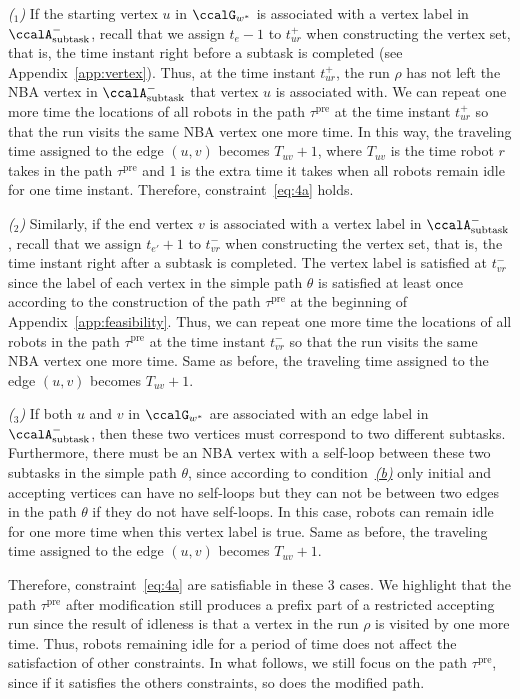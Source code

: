 \documentclass[Afour,sageh,times]{sagej}
\newcounter{mycounter}
\newcommand{\auto}[1]{\ccalA_{\textup{#1}}}
\begin{document}
{{\it ($_1$)} If the starting vertex $u$ in $\ccalG_{w^*}$ is associated with a vertex label in $\auto{subtask}^-$, recall that we assign $t_e-1$ to $t_{ur}^+$ when constructing the vertex set, that is, the time instant right before a subtask is completed (see Appendix~\ref{app:vertex}). Thus, at the time instant $t_{ur}^+$, the run $\rho$ has not left the NBA vertex in $\auto{subtask}^-$ that vertex $u$ is associated with. We can repeat one more time the locations of all robots in the path $\tau^\text{pre}$ at the time instant $t_{ur}^+$  so that the run visits the same NBA vertex  one more time. In this way, the traveling time assigned to  the edge $(u,v)$ becomes $T_{uv}+1$, where $T_{uv}$ is the time robot $r$ takes in the path $\tau^\text{pre}$ and 1 is the extra time it takes when all robots remain idle for one time instant. Therefore, constraint~\eqref{eq:4a} holds.

{\it ($_2$)} Similarly, if the end vertex $v$ is associated with a vertex label in $\auto{subtask}^-$, recall that we assign $t_{e'}+1$ to $t_{vr}^-$ when constructing the vertex set, that is, the time instant right after a subtask is completed. The vertex label is satisfied at $t_{vr}^-$ since the  label of each vertex in the simple path $\theta$ is satisfied at least once according to the construction of the path $\tau^\text{pre}$ at the beginning of Appendix~\ref{app:feasibility}. Thus, we can repeat one more  time the locations of all robots in the path $\tau^\text{pre}$ at the time instant $t_{vr}^-$  so that the run visits the same NBA vertex  one  more time. Same as before, the traveling time assigned to  the edge $(u,v)$ becomes $T_{uv}+1$.

{\it ($_3$)} If both $u$ and $v$ in $\ccalG_{w^*}$ are associated with an edge label in $\auto{subtask}^-$, then these two vertices must correspond to two different subtasks. Furthermore, there must be an NBA vertex with a  self-loop between these two subtasks in the simple path $\theta$, since according to condition~\hyperref[cond:b]{\it (b)} only initial and accepting vertices can have no self-loops but they can not be between two edges in the path $\theta$ if they do not have self-loops. In this case, robots can remain idle for one more time  when this vertex label is true. Same as before, the traveling time assigned to  the edge $(u,v)$ becomes $T_{uv}+1$.


Therefore, constraint~\eqref{eq:4a} are satisfiable in these 3 cases. We highlight that the path $\tau^\text{pre}$ after modification still produces a prefix part of a restricted accepting run since the result of idleness is  that a vertex in the run $\rho$ is visited by one more time.  Thus, robots remaining idle for a period of time does not affect the satisfaction of other constraints. In what follows, we still focus on the path $\tau^\text{pre}$, since if it satisfies the others constraints, so does the modified path.

}
\end{document}
